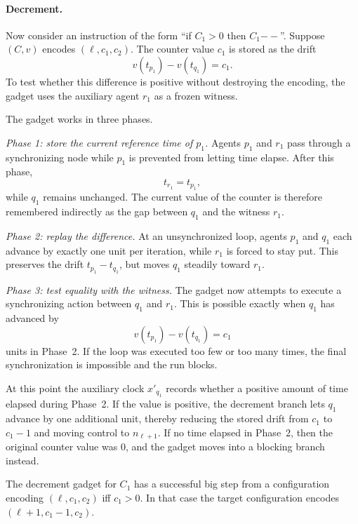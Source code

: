 \paragraph{Decrement.}
Now consider an instruction of the form ``if $C_1>0$ then $C_1{--}$''.
Suppose $(C,v)$ encodes $(\ell,c_1,c_2)$.  The counter value $c_1$ is stored as
the drift
\[
v(t_{p_1})-v(t_{q_1})=c_1.
\]
To test whether this difference is positive without destroying the encoding, the
gadget uses the auxiliary agent $r_1$ as a frozen witness.

The gadget works in three phases.

\emph{Phase 1: store the current reference time of $p_1$.}
Agents $p_1$ and $r_1$ pass through a synchronizing node while $p_1$ is
prevented from letting time elapse.  After this phase,
\[
t_{r_1}=t_{p_1},
\]
while $q_1$ remains unchanged.  The current value of the counter is therefore
remembered indirectly as the gap between $q_1$ and the witness $r_1$.

\emph{Phase 2: replay the difference.}
At an unsynchronized loop, agents $p_1$ and $q_1$ each advance by exactly one
unit per iteration, while $r_1$ is forced to stay put.  This preserves the
drift $t_{p_1}-t_{q_1}$, but moves $q_1$ steadily toward $r_1$.

\emph{Phase 3: test equality with the witness.}
The gadget now attempts to execute a synchronizing action between $q_1$ and
$r_1$.  This is possible exactly when $q_1$ has advanced by
\[
v(t_{p_1})-v(t_{q_1})=c_1
\]
units in Phase~2.  If the loop was executed too few or too many times, the
final synchronization is impossible and the run blocks.

At this point the auxiliary clock $x'_{q_1}$ records whether a positive amount
of time elapsed during Phase~2.  If the value is positive, the decrement branch
lets $q_1$ advance by one additional unit, thereby reducing the stored drift
from $c_1$ to $c_1-1$ and moving control to $n_{\ell+1}$.  If no time elapsed
in Phase~2, then the original counter value was $0$, and the gadget moves into
a blocking branch instead.

\begin{lemma}
\label{lem:decrement}
The decrement gadget for $C_1$ has a successful big step from a configuration
encoding $(\ell,c_1,c_2)$ iff $c_1>0$.  In that case the target configuration
encodes $(\ell+1,c_1-1,c_2)$.
\end{lemma}

